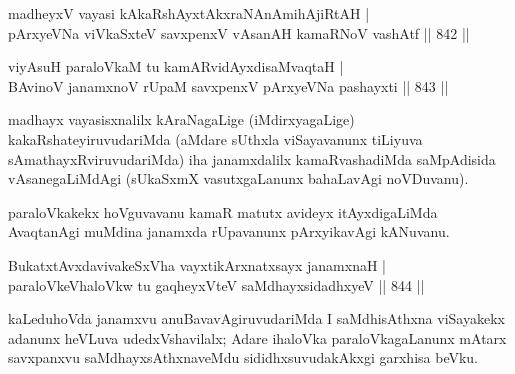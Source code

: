 \begin{shl}
\footnotemark[2]madheyxV vayasi kAkaRshAyxtAkxraNAnAmihA\s \s jiRtAH | \\
pArxyeVNa viVkaSxteV savxpenxV vAsanAH kamaRNoV vashAtf \hfill||  842 ||  
\end{shl}
				
\begin{shl}
viyAsuH paraloVkaM tu kamARvidAyxdisaMvaqtaH | \\
BAvinoV janamxnoV rUpaM savxpenxV pArxyeVNa pashayxti \hfill||  843 ||  
\end{shl}

\begin{artha}

madhayx vayasisxnalilx kAraNagaLige (iMdirxyagaLige) kakaRshateyiruvudariMda (aMdare sUthxla viSayavanunx tiLiyuva sAmathayxRviruvudariMda) iha janamxdalilx kamaRvashadiMda saMpAdisida vAsanegaLiMdAgi (sUkaSxmX vasutxgaLanunx bahaLavAgi noVDuvanu).
\end{artha}

\begin{artha}
paraloVkakekx hoVguvavanu kamaR matutx avideyx itAyxdigaLiMda AvaqtanAgi muMdina janamxda rUpavanunx pArxyikavAgi kANuvanu.
\end{artha}


\begin{shl}
BukatxtAvxdavivakeSxVha vayxtikArxnatxsayx janamxnaH | \\
paraloVkeVhaloVkw tu gaqheyxVteV saMdhayxsidadhxyeV \hfill||  844 ||  
\end{shl}

\begin{artha}
kaLeduhoVda janamxvu anuBavavAgiruvudariMda I saMdhisAthxna viSayakekx adanunx heVLuva udedxVshavilalx; Adare ihaloVka paraloVkagaLanunx mAtarx savxpanxvu saMdhayxsAthxnaveMdu sididhxsuvudakAkxgi garxhisa beVku.
\end{artha}


